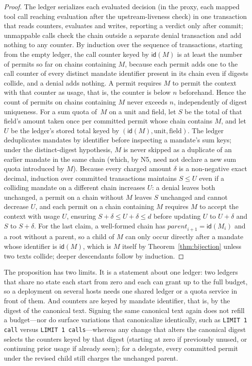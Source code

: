\documentclass[10pt,twocolumn]{article}
\theoremstyle{plain}
\theoremstyle{definition}
\begin{document}
\begin{proof}
The ledger serializes each evaluated decision (in the proxy, each mapped tool call reaching evaluation after the upstream-liveness check) in one transaction that reads counters, evaluates and writes, reporting a verdict only after commit; unmappable calls check the chain outside a separate denial transaction and add nothing to any counter. By induction over the sequence of transactions, starting from the empty ledger, the call counter keyed by $\mathsf{id}(M)$ is at least the number of permits so far on chains containing $M$, because each permit adds one to the call counter of every distinct mandate identifier present in its chain even if digests collide, and a denial adds nothing. A permit requires $M$ to permit the context with that counter as usage, that is, the counter is below $n$ beforehand. Hence the count of permits on chains containing $M$ never exceeds $n$, independently of digest uniqueness. For a sum quota of~$M$ on a unit and field, let $S$ be the total of that field's amount taken once per committed permit whose chain contains $M$, and let $U$ be the ledger's stored total keyed by $(\mathsf{id}(M), \text{unit}, \text{field})$. The ledger deduplicates mandates by identifier before inspecting a mandate's sum keys; under the distinct-digest hypothesis, $M$ is never skipped as a duplicate of an earlier mandate in the same chain (which, by N5, need not declare a new sum quota introduced by $M$). Because every charged amount $\delta$ is a non-negative exact decimal, induction over committed transactions maintains $S \le U$ even if a colliding mandate on a different chain increases $U$: a denial leaves both unchanged, a permit on a chain without $M$ leaves $S$ unchanged and cannot decrease $U$, and each permit on a chain containing $M$ requires $M$ to accept the context with usage $U$, ensuring $S + \delta \le U + \delta \le d$ before updating $U$ to $U + \delta$ and $S$ to $S + \delta$. For the last claim, a well-formed chain has $\mathit{parent}_{i+1} = \mathsf{id}(M_i)$ and a root without a parent, so a child of $M$ can only occur directly after a mandate whose identifier is $\mathsf{id}(M)$, which is $M$ itself by Theorem~\ref{thm:bijection} unless two texts collide; deeper descendants follow by induction.
\end{proof}

The proposition has two limits. It is a statement about one ledger: two ledgers that share no state each start from zero and each can grant up to the full budget, so a deployment on several hosts needs one shared ledger or a quota service in front of them. And counters are keyed by mandate identifier, that is, by the digest of the canonical text. Signing the same canonical text again does not refill a budget---nor do surface variations that canonicalize identically, such as \texttt{LIMIT 1 call} versus \texttt{LIMIT 1 calls}---whereas any change that alters the canonical digest selects the counters keyed by that digest (starting at zero if previously unused, or continuing prior usage if already seen); for a delegate, every committed permit under the revised child still charges the unchanged parent.
\end{document}
